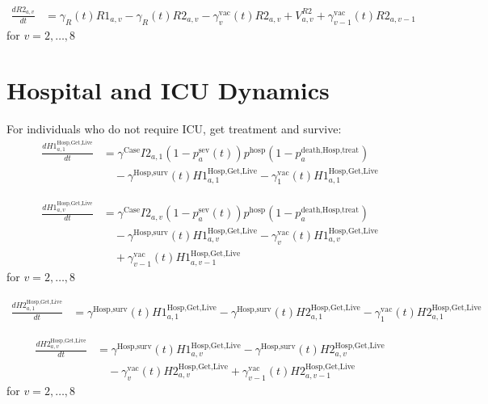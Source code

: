\documentclass[12pt]{article}
\begin{document}
\begin{align*}
\frac{dR2_{a,v}}{dt} &= \gamma_R(t) R1_{a,v} - \gamma_R(t) R2_{a,v} - \gamma^{\text{vac}}_v(t) R2_{a,v} + V^{R2}_{a,v} + \gamma^{\text{vac}}_{v-1}(t) R2_{a,v-1}
\end{align*}
for $v = 2, \ldots, 8$

\section{Hospital and ICU Dynamics}

For individuals who do not require ICU, get treatment and survive:
\begin{align*}
\frac{dH1^{\text{Hosp,Get,Live}}_{a,1}}{dt} &= \gamma^{\text{Case}} I2_{a,1} (1 - p^{\text{sev}}_a(t)) p^{\text{hosp}} (1 - p^{\text{death,Hosp,treat}}_a) \\
&\quad - \gamma^{\text{Hosp,surv}}(t) H1^{\text{Hosp,Get,Live}}_{a,1} - \gamma^{\text{vac}}_1(t) H1^{\text{Hosp,Get,Live}}_{a,1}
\end{align*}

\begin{align*}
\frac{dH1^{\text{Hosp,Get,Live}}_{a,v}}{dt} &= \gamma^{\text{Case}} I2_{a,v} (1 - p^{\text{sev}}_a(t)) p^{\text{hosp}} (1 - p^{\text{death,Hosp,treat}}_a) \\
&\quad - \gamma^{\text{Hosp,surv}}(t) H1^{\text{Hosp,Get,Live}}_{a,v} - \gamma^{\text{vac}}_v(t) H1^{\text{Hosp,Get,Live}}_{a,v} \\
&\quad + \gamma^{\text{vac}}_{v-1}(t) H1^{\text{Hosp,Get,Live}}_{a,v-1}
\end{align*}
for $v = 2, \ldots, 8$

\begin{align*}
\frac{dH2^{\text{Hosp,Get,Live}}_{a,1}}{dt} &= \gamma^{\text{Hosp,surv}}(t) H1^{\text{Hosp,Get,Live}}_{a,1} - \gamma^{\text{Hosp,surv}}(t) H2^{\text{Hosp,Get,Live}}_{a,1} - \gamma^{\text{vac}}_1(t) H2^{\text{Hosp,Get,Live}}_{a,1}
\end{align*}

\begin{align*}
\frac{dH2^{\text{Hosp,Get,Live}}_{a,v}}{dt} &= \gamma^{\text{Hosp,surv}}(t) H1^{\text{Hosp,Get,Live}}_{a,v} - \gamma^{\text{Hosp,surv}}(t) H2^{\text{Hosp,Get,Live}}_{a,v} \\
&\quad - \gamma^{\text{vac}}_v(t) H2^{\text{Hosp,Get,Live}}_{a,v} + \gamma^{\text{vac}}_{v-1}(t) H2^{\text{Hosp,Get,Live}}_{a,v-1}
\end{align*}
for $v = 2, \ldots, 8$
\end{document}
